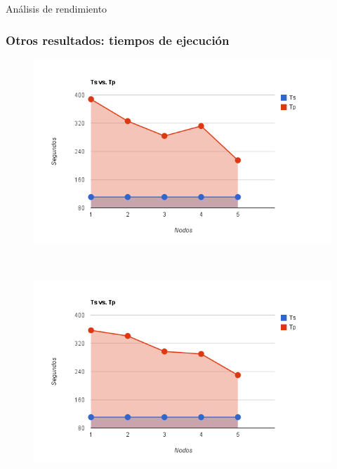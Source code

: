 \begin{subsection}{Análisis de rendimiento}
\begin{frame}\frametitle{Otros resultados: tiempos de ejecución}
\begin{center}
\begin{figure}[!ht]

	\begin{minipage}{3cm}
		\includegraphics[scale=0.3]{images/grafico_de_tiempos1.png}
    \end{minipage}
    \    \ \hfill
	\begin{minipage}{5cm}
	    \includegraphics[scale=0.3]{images/grafico_de_tiempos2.png}
	\end{minipage}
\end{figure}
\end{center}

\end{frame}

\end{subsection}

